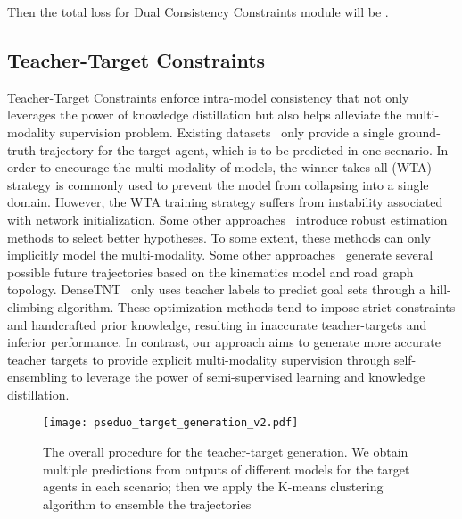 \documentclass[10pt,twocolumn,letterpaper]{article}
\begin{document}
Then the total loss for Dual Consistency Constraints module will be .


\subsection{Teacher-Target Constraints}
\label{sec:mpt_supervision}
Teacher-Target Constraints enforce intra-model consistency that not only leverages the power of knowledge distillation but also helps alleviate the multi-modality supervision problem. Existing datasets~\cite{chang2019argoverse,sun2020scalability} only provide a single ground-truth trajectory for the target agent, which is to be predicted in one scenario. In order to encourage the multi-modality of models, the winner-takes-all (WTA) strategy is commonly used to prevent the model from collapsing into a single domain. However, the WTA training strategy suffers from instability associated with network initialization. Some other approaches~\cite{breuer2021quo,narayanan2021divide} introduce robust estimation methods to select better hypotheses. 
To some extent, these methods can only implicitly model the multi-modality. Some other approaches~\cite{breuer2021quo,zhao2020tnt} generate several possible future trajectories based on the kinematics model and road graph topology. DenseTNT~\cite{gu2021densetnt} only uses teacher labels to predict goal sets through a hill-climbing algorithm. These optimization methods tend to impose strict constraints and handcrafted prior knowledge, resulting in inaccurate teacher-targets and inferior performance. In contrast, our approach aims to generate more accurate teacher targets to provide explicit multi-modality supervision through self-ensembling to leverage the power of semi-supervised learning and knowledge distillation.


\begin{figure*}
    \centering
\texttt{[image: pseduo\_target\_generation\_v2.pdf]}
    \caption{The overall procedure for the teacher-target generation. We obtain multiple predictions from outputs of different models for the target agents in each scenario; then we apply the K-means clustering algorithm to ensemble the trajectories}
    \label{fig:pseduo_target_generation}
    
\end{figure*}
\end{document}
